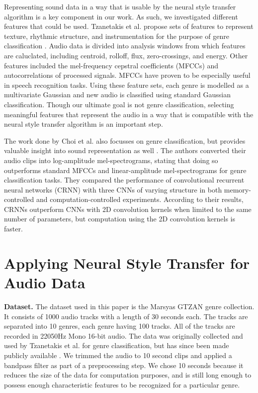 \documentclass{article}
\begin{document}
Representing sound data in a way that is usable by the neural style transfer algorithm is a key component in our work. As such, we investigated different features that could be used. Tzanetakis et al. propose sets of features to represent texture, rhythmic structure, and instrumentation for the purpose of genre classification \citep{Tzanetakis2001}. Audio data is divided into analysis windows from which features are caluclated, including centroid, rolloff, flux, zero-crossings, and energy. Other features included the mel-frequency cepstral coefficients (MFCCs) and autocorrelations of processed signals. MFCCs have proven to be especially useful in speech recognition tasks. Using these feature sets, each genre is modelled as a multivariate Gaussian and new audio is classified using standard Gaussian classification. Though our ultimate goal is not genre classification, selecting meaningful features that represent the audio in a way that is compatible with the neural style transfer algorithm is an important step.

The work done by Choi et al. also focusses on genre classification, but provides valuable insight into sound representation as well \citep{Choi2016}. The authors converted their audio clips into log-amplitude mel-spectrograms, stating that doing so outperforms standard MFCCs and linear-amplitude mel-spectrograms for genre classification tasks. They compared the performance of convolutional recurrent neural networks (CRNN) with three CNNs of varying structure in both memory-controlled and computation-controlled experiments. According to their results, CRNNs outperform CNNs with 2D convolution kernels when limited to the same number of parameters, but computation using the 2D convolution kernels is faster.

\section{Applying Neural Style Transfer for Audio Data}

\textbf{Dataset.} \hspace{0.25cm} The dataset used in this paper is the Marsyas GTZAN genre collection. It consists of 1000 audio tracks with a length of 30 seconds each. The tracks are separated into 10 genres, each genre having 100 tracks. All of the tracks are recorded in 22050Hz Mono 16-bit audio. The data was originally collected and used by Tzanetakis et al. for genre classification, but has since been made publicly available \citep{Tzanetakis2002}. We trimmed the audio to 10 second clips and applied a bandpass filter as part of a preprocessing step. We chose 10 seconds because it reduces the size of the data for computation purposes, and is still long enough to possess enough characteristic features to be recognized for a particular genre.
\end{document}

